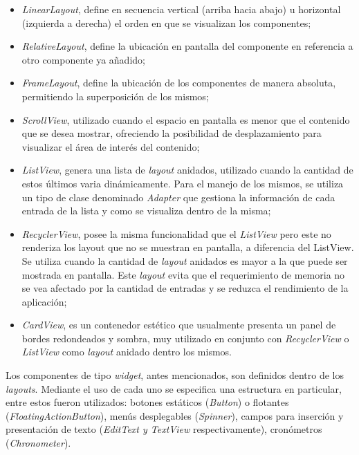     \begin{itemize}
        \item \textit{LinearLayout}, define en secuencia vertical (arriba hacia abajo)  u horizontal (izquierda a derecha) el orden en que se visualizan los componentes;
        
        \item \textit{RelativeLayout}, define la ubicación en pantalla del componente en referencia a otro componente ya añadido;
        
        \item \textit{FrameLayout}, define la ubicación de los componentes de manera absoluta, permitiendo la superposición de los mismos;
        
        \item \textit{ScrollView}, utilizado cuando el espacio en pantalla es menor que el contenido que se desea mostrar, ofreciendo la posibilidad de desplazamiento para visualizar el área de interés del contenido;
        
        \item \textit{ListView}, genera una lista de \textit{layout} anidados, utilizado cuando la cantidad de estos últimos varia dinámicamente. Para el manejo de los mismos, se utiliza un tipo de clase denominado \textit{Adapter} que gestiona la información de cada entrada de la lista y como se visualiza dentro de la misma;
        
        \item \textit{RecyclerView}, posee la misma funcionalidad que el \textit{ListView} pero este no renderiza los layout que no se muestran en pantalla, a diferencia del ListView. Se utiliza cuando la cantidad de \textit{layout} anidados es mayor a la que puede ser mostrada en pantalla. Este \textit{layout} evita que el requerimiento de memoria no se vea afectado por la cantidad de entradas y se reduzca el rendimiento de la aplicación;
        
        \item \textit{CardView}, es un contenedor estético que usualmente presenta un panel de bordes redondeados y sombra, muy utilizado en conjunto con \textit{RecyclerView} o \textit{ListView} como \textit{layout} anidado dentro los mismos.
        
    \end{itemize}

    
    \par Los componentes de tipo \textit{widget}, antes mencionados, son definidos dentro de los \textit{layouts}. Mediante el uso de cada uno se especifica una estructura en particular, entre estos fueron utilizados: botones estáticos (\textit{Button}) o flotantes (\textit{FloatingActionButton}), menús desplegables (\textit{Spinner}), campos para inserción y presentación de texto (\textit{EditText y TextView} respectivamente), cronómetros (\textit{Chronometer}).
        
